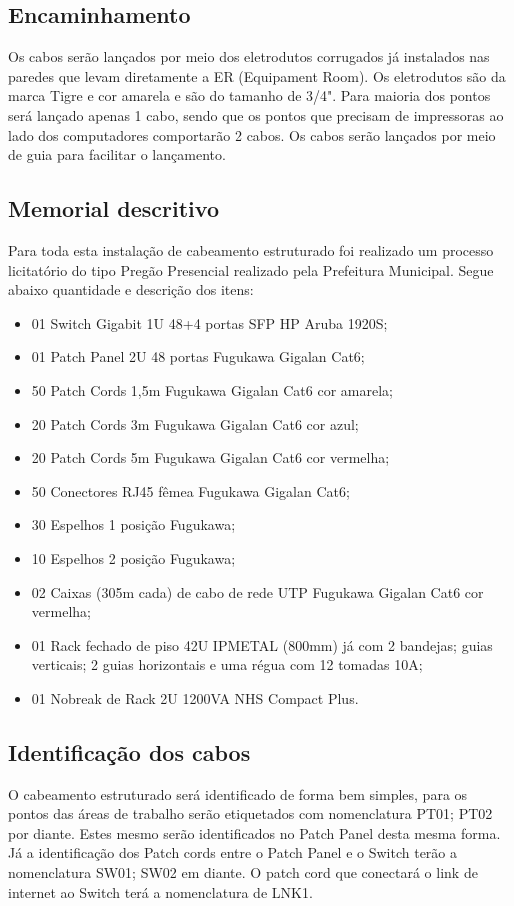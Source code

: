 \documentclass[	DIV=calc,%
							paper=a4,%
							fontsize=12pt,%
							onecolumn]{scrartcl}	 					%
\begin{document}
\subsection{Encaminhamento}
Os cabos serão lançados por meio dos eletrodutos corrugados já instalados nas paredes que levam diretamente a ER (Equipament Room). Os eletrodutos são da marca Tigre e cor amarela e são do tamanho de 3/4". Para maioria dos pontos será lançado apenas 1 cabo, sendo que os pontos que precisam de impressoras ao lado dos computadores comportarão 2 cabos. Os cabos serão lançados por meio de guia para facilitar o lançamento. 

\subsection{Memorial descritivo}
Para toda esta instalação de cabeamento estruturado foi realizado um processo licitatório do tipo Pregão Presencial realizado pela Prefeitura Municipal. Segue abaixo quantidade e descrição dos itens:
\begin{itemize}
\item 01	Switch Gigabit 1U 48+4 portas SFP HP Aruba 1920S;
\item 01	Patch Panel 2U 48 portas Fugukawa Gigalan Cat6;
\item 50	Patch Cords 1,5m Fugukawa Gigalan Cat6 cor amarela;
\item 20	Patch Cords 3m Fugukawa Gigalan Cat6 cor azul;
\item 20	Patch Cords 5m Fugukawa Gigalan Cat6 cor vermelha;
\item 50	Conectores RJ45 fêmea Fugukawa Gigalan Cat6;
\item 30 	Espelhos 1 posição Fugukawa;
\item 10 	Espelhos 2 posição Fugukawa;
\item 02	Caixas (305m cada) de cabo de rede UTP Fugukawa Gigalan Cat6 cor vermelha;
\item 01 	Rack fechado de piso 42U IPMETAL (800mm) já com 2 bandejas; guias verticais; 2 guias horizontais e uma régua com 12 tomadas 10A;
\item 01	Nobreak de Rack 2U 1200VA NHS Compact Plus. 
\end{itemize}

\subsection{Identificação dos cabos}
O cabeamento estruturado será identificado de forma bem simples, para os pontos das áreas de trabalho serão etiquetados com nomenclatura PT01; PT02 por diante. Estes mesmo serão identificados no Patch Panel desta mesma forma. Já a identificação dos Patch cords entre o Patch Panel e o Switch terão a nomenclatura SW01; SW02 em diante. O patch cord que conectará o link de internet ao Switch terá a nomenclatura de LNK1. 
\end{document}
